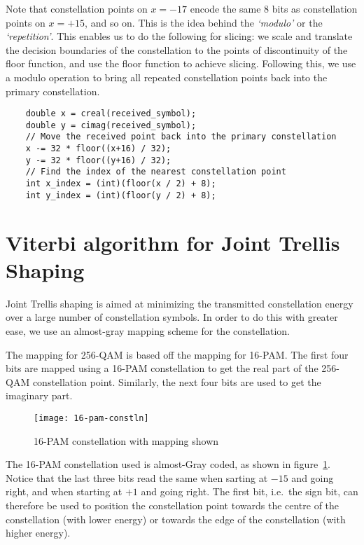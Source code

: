 Note that constellation points on $x=-17$ encode the same 8 bits as
constellation points on $x=+15$, and so on. This is the idea behind the
\emph{`modulo'} or the \emph{`repetition'}. This enables us to do the following
for slicing: we scale and translate the decision boundaries of the
constellation to the points of discontinuity of the floor function, and use the
floor function to achieve slicing. Following this, we use a modulo operation to
bring all repeated constellation points back into the primary constellation.

\begin{lstlisting}
	double x = creal(received_symbol);
	double y = cimag(received_symbol);
	// Move the received point back into the primary constellation
	x -= 32 * floor((x+16) / 32);
	y -= 32 * floor((y+16) / 32);
	// Find the index of the nearest constellation point
	int x_index = (int)(floor(x / 2) + 8);
	int y_index = (int)(floor(y / 2) + 8);
\end{lstlisting}


\section{Viterbi algorithm for Joint Trellis Shaping}

Joint Trellis shaping is aimed at minimizing the transmitted constellation
energy over a large number of constellation symbols. In order to do this with
greater ease, we use an almost-gray mapping scheme for the constellation.

The mapping for 256-QAM is based off the mapping for 16-PAM. The first four
bits are mapped using a 16-PAM constellation to get the real part of the
256-QAM constellation point. Similarly, the next four bits are used to get the
imaginary part.

\begin{figure}[h]
	\centering
	\texttt{[image: 16-pam-constln]}
	\caption{16-PAM constellation with mapping shown}
	\label{fig:16-pam}
\end{figure}

The 16-PAM constellation used is almost-Gray coded, as shown in
figure~\ref{fig:16-pam}. Notice that the last three bits read the same when
sarting at $-15$ and going right, and when starting at $+1$ and going right.
The first bit, i.e.\ the sign bit, can therefore be used to position the
constellation point towards the centre of the constellation (with lower energy)
or towards the edge of the constellation (with higher energy).

